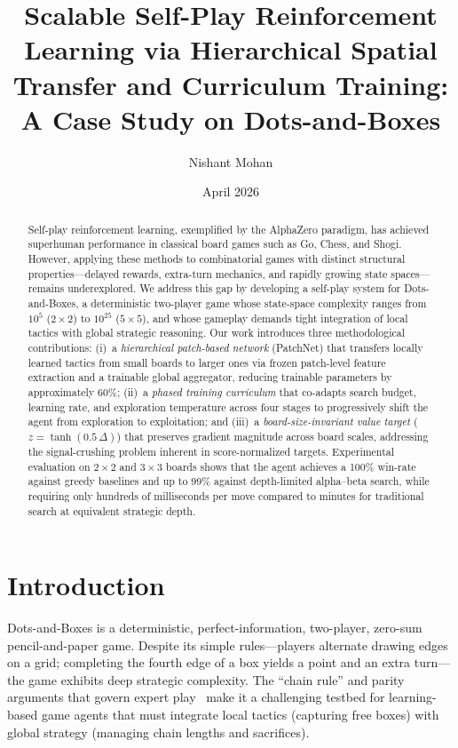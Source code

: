 \documentclass[11pt]{article}
\title{Scalable Self-Play Reinforcement Learning via Hierarchical Spatial Transfer and Curriculum Training: A Case Study on Dots-and-Boxes}
\author{Nishant Mohan}
\date{April 2026}
\begin{document}
\maketitle

\begin{abstract}
Self-play reinforcement learning, exemplified by the AlphaZero paradigm,
has achieved superhuman performance in classical board games such as Go,
Chess, and Shogi. However, applying these methods to combinatorial games
with distinct structural properties---delayed rewards, extra-turn
mechanics, and rapidly growing state spaces---remains underexplored.
We address this gap by developing a self-play system for Dots-and-Boxes,
a deterministic two-player game whose state-space complexity ranges from
$10^5$ ($2{\times}2$) to $10^{25}$ ($5{\times}5$), and whose gameplay
demands tight integration of local tactics with global strategic reasoning.
Our work introduces three methodological contributions:
(i)~a \emph{hierarchical patch-based network} (PatchNet) that transfers
locally learned tactics from small boards to larger ones via frozen
patch-level feature extraction and a trainable global aggregator,
reducing trainable parameters by approximately 60\%;
(ii)~a \emph{phased training curriculum} that co-adapts search budget,
learning rate, and exploration temperature across four stages to
progressively shift the agent from exploration to exploitation;
and (iii)~a \emph{board-size-invariant value target}
($z=\tanh(0.5\,\Delta)$) that preserves gradient magnitude across
board scales, addressing the signal-crushing problem inherent in
score-normalized targets.
Experimental evaluation on $2{\times}2$ and $3{\times}3$ boards shows
that the agent achieves a 100\% win-rate against greedy baselines and
up to 99\% against depth-limited alpha--beta search, while requiring
only hundreds of milliseconds per move compared to minutes for
traditional search at equivalent strategic depth.
\end{abstract}

\section{Introduction}

Dots-and-Boxes is a deterministic, perfect-information, two-player,
zero-sum pencil-and-paper game. Despite its simple rules---players
alternate drawing edges on a grid; completing the fourth edge of a box
yields a point and an extra turn---the game exhibits deep strategic
complexity. The ``chain rule'' and parity arguments that govern expert
play~\cite{berlekamp2000dots} make it a challenging testbed for
learning-based game agents that must integrate local tactics (capturing
free boxes) with global strategy (managing chain lengths and sacrifices).
\end{document}
